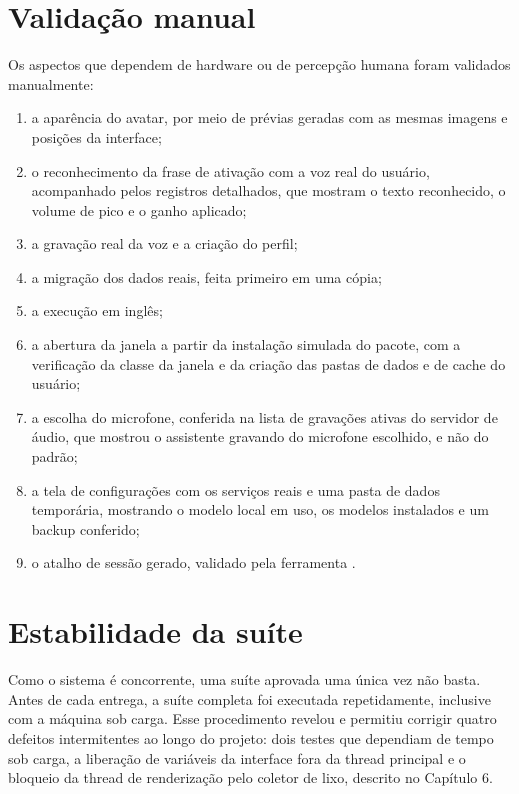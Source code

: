 \section{Validação manual}

Os aspectos que dependem de hardware ou de percepção humana foram validados manualmente:
\begin{enumerate}[label=\alph*)]
  \item a aparência do avatar, por meio de prévias geradas com as mesmas imagens e posições da interface;
  \item o reconhecimento da frase de ativação com a voz real do usuário, acompanhado pelos registros
        detalhados, que mostram o texto reconhecido, o volume de pico e o ganho aplicado;
  \item a gravação real da voz e a criação do perfil;
  \item a migração dos dados reais, feita primeiro em uma cópia;
  \item a execução em inglês;
  \item a abertura da janela a partir da instalação simulada do pacote, com a verificação da classe da
        janela e da criação das pastas de dados e de cache do usuário;
  \item a escolha do microfone, conferida na lista de gravações ativas do servidor de áudio, que mostrou
        o assistente gravando do microfone escolhido, e não do padrão;
  \item a tela de configurações com os serviços reais e uma pasta de dados temporária, mostrando o
        modelo local em uso, os modelos instalados e um backup conferido;
  \item o atalho de sessão gerado, validado pela ferramenta .
\end{enumerate}

\section{Estabilidade da suíte}

Como o sistema é concorrente, uma suíte aprovada uma única vez não basta. Antes de cada entrega, a suíte
completa foi executada repetidamente, inclusive com a máquina sob carga. Esse procedimento revelou e
permitiu corrigir quatro defeitos intermitentes ao longo do projeto: dois testes que dependiam de
tempo sob carga, a liberação de variáveis da interface fora da thread principal e o bloqueio da thread
de renderização pelo coletor de lixo, descrito no Capítulo 6.
